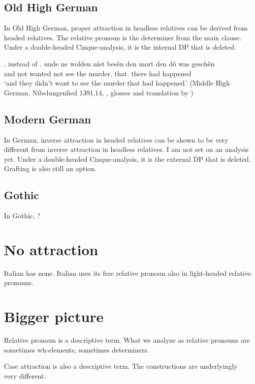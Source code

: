     \subsection{Old High German}
In Old High German, proper attraction in headless relatives can be derived from headed relatives. The relative pronoun is the determiner from the main clause. Under a double-headed Cinque-analysis, it is the internal DP that is deleted.




\ex.  instead of 
\ag. unde ne wolden níet besên den mort den dô was geschên\\
 and not wanted not see the murder. that. there had happened\\
 `and they didn't want to see the murder that had happened.' \hfill (Middle High German, Nibelungenlied 1391,14, \citealt[756]{behaghel1923}, glosses and translation by \citealt[198]{pittner1995})



    \subsection{Modern German}
In German, inverse attraction in headed relatives can be shown to be very different from inverse attraction in headless relatives. I am not set on an analysis yet. Under a double-headed Cinque-analysis, it is the external DP that is deleted. Grafting is also still an option.

    \subsection{Gothic}
In Gothic, ?


\section{No attraction}
Italian has none. Italian uses its free relative pronoun also in light-headed relative pronouns.


  \section{Bigger picture}
Relative pronoun is a descriptive term. What we analyze as relative pronouns are sometimes wh-elements, sometimes determiners.

Case attraction is also a descriptive term. The constructions are underlyingly very different.
